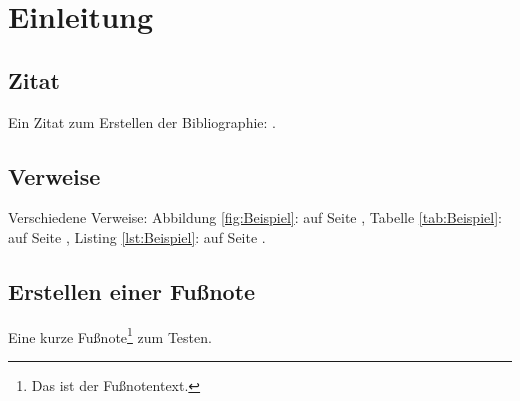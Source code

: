 \section{Einleitung}
\label{sec:Einleitung}

\subsection{Zitat}
\label{ssec:Zitat} %
Ein Zitat zum Erstellen der Bibliographie: . %

\subsection{Verweise}
\label{ssec:Verweise}
Verschiedene Verweise: Abbildung \ref{fig:Beispiel}:  auf Seite \pageref{fig:Beispiel}, Tabelle \ref{tab:Beispiel}:  auf Seite \pageref{tab:Beispiel}, Listing \ref{lst:Beispiel}:  auf Seite \pageref{lst:Beispiel}.

\subsection{Erstellen einer Fußnote}
\label{ssec:Fußnote}
Eine kurze Fußnote\footnote{Das ist der Fußnotentext.} zum Testen.